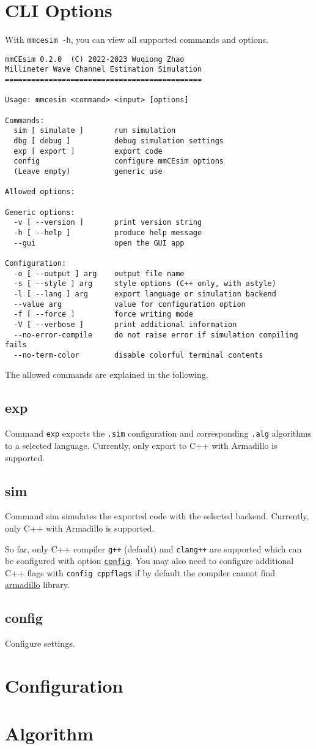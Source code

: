 \section{CLI Options}
With \texttt{mmcesim -h}, you can view all supported commands and options.
\begin{lstlisting}
mmCEsim 0.2.0  (C) 2022-2023 Wuqiong Zhao
Millimeter Wave Channel Estimation Simulation
=============================================

Usage: mmcesim <command> <input> [options]

Commands:
  sim [ simulate ]       run simulation
  dbg [ debug ]          debug simulation settings
  exp [ export ]         export code
  config                 configure mmCEsim options
  (Leave empty)          generic use

Allowed options:

Generic options:
  -v [ --version ]       print version string
  -h [ --help ]          produce help message
  --gui                  open the GUI app

Configuration:
  -o [ --output ] arg    output file name
  -s [ --style ] arg     style options (C++ only, with astyle)
  -l [ --lang ] arg      export language or simulation backend
  --value arg            value for configuration option
  -f [ --force ]         force writing mode
  -V [ --verbose ]       print additional information
  --no-error-compile     do not raise error if simulation compiling fails
  --no-term-color        disable colorful terminal contents
\end{lstlisting}

The allowed commands are explained in the following.

\subsection{exp}
Command \texttt{exp} exports the \texttt{.sim} configuration and corresponding \texttt{.alg} algorithms
to a selected language.
Currently, only export to C++ with Armadillo is supported.

\subsection{sim}
Command sim simulates the exported code with the selected backend. Currently, only C++ with Armadillo is supported.

So far, only C++ compiler \texttt{g++} (default) and \texttt{clang++} are supported which can be configured with option \hyperref[d:subsec:config]{\texttt{config}}.
You may also need to configure additional C++ flags with \texttt{config cppflags} if by default the compiler cannot find
\href{https://arma.sourceforge.net/}{armadillo}
library.

\subsection{config}\label{d:subsec:config}
Configure settings.

\section{Configuration}

\section{Algorithm}
